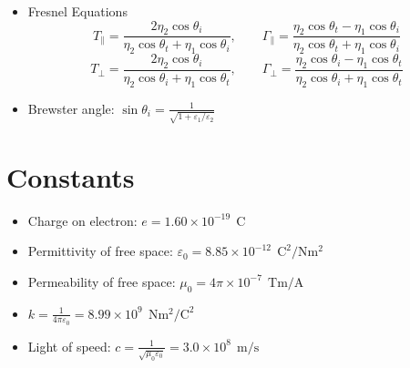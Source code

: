 \documentclass[a4paper, 11pt]{article}
\begin{document}
\begin{enumerate}
\begin{itemize}[leftmargin=*]
	\item Fresnel Equations 
        \[
            T_{\parallel}= \frac{2\eta_{2}\cos\theta_{i}}{\eta_{2}\cos\theta_{t}+\eta_{1}\cos\theta_{i}},
            \quad \quad
            \Gamma_{\parallel} = \frac{\eta_{2}\cos\theta_{t}-\eta_{1}\cos\theta_{i}}{\eta_{2}\cos\theta_{t}+\eta_{1}\cos\theta_{i}}
        \]
        \[
            T_{\perp}= \frac{2\eta_{2}\cos\theta_{i}}{\eta_{2}\cos\theta_{i}+\eta_{1}\cos\theta_{t}},
            \quad \quad
            \Gamma_{\perp} = \frac{\eta_{2}\cos\theta_{i}-\eta_{1}\cos\theta_{t}}{\eta_{2}\cos\theta_{i}+\eta_{1}\cos\theta_{t}}
        \]
        
	\item Brewster angle: $\displaystyle \sin\theta_{i}=\frac{1}{\sqrt{1+\varepsilon_{1}/\varepsilon_{2}}}$
\end{itemize}
\end{enumerate}

\section*{Constants}
\begin{itemize}
    \item Charge on electron: $e = 1.60 \times 10^{-19} \ \ \mathrm{C}$
    
    \item Permittivity of free space: $\varepsilon_{0} = 8.85 \times 10^{-12} \ \ \mathrm{C^{2}/Nm^{2}}$
    
    \item Permeability of free space: $\mu_{0}  = 4\pi \times 10^{-7} \ \ \mathrm{Tm/A}$
    
    \item $k = \frac{1}{4\pi \varepsilon_{0}} = 8.99\times 10^{9} \ \ \mathrm{Nm^{2}/C^{2}}$
    
    \item Light of speed: $c = \frac{1}{\sqrt{\mu_{0}\varepsilon_{0}}} = 3.0\times 10^{8} \ \ \mathrm{m/s}$
\end{itemize}

\vspace*{\fill}
\end{document}
